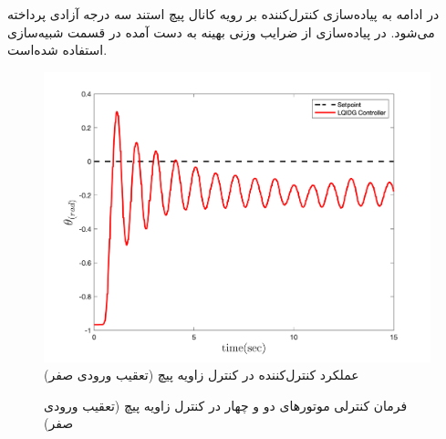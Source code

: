  در ادامه به پیاده‌سازی کنترل‌کننده  بر رویه کانال پیچ استند سه درجه آزادی پرداخته می‌شود.
در پیاده‌سازی از ضرایب وزنی بهینه به دست آمده در قسمت شبیه‌سازی استفاده شده‌است.
\begin{figure}[H]
	\includegraphics[width=.48\linewidth]{../Figures/Calibration/LQDG/Pitch/lqdg_pitch.png}
	\centering
	\caption{عملكرد کنترل‌کننده  در کنترل زاويه پیچ (تعقیب ورودی صفر)}
\end{figure}

\begin{figure}[H]
	\centering
	\caption{‫‪فرمان کنترلی موتورهای دو و چهار در کنترل زاویه پیچ (تعقیب ورودی صفر)}
\end{figure}



